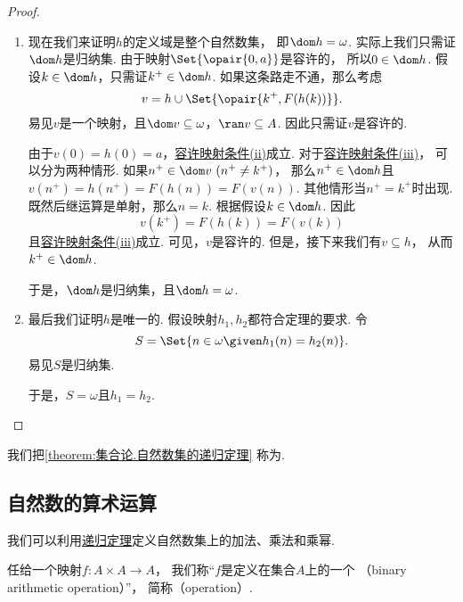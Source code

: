 \begin{theorem}[递归定理]
\begin{proof}
\begin{enumerate}
	\item 现在我们来证明\(h\)的定义域是整个自然数集，
	即\(\dom h = \omega\).
	实际上我们只需证\(\dom h\)是归纳集.
	由于映射\(\Set{\opair{0,a}}\)是容许的，
	所以\(0 \in \dom h\).
	假设\(k \in \dom h\)，只需证\(k^+ \in \dom h\).
	如果这条路走不通，那么考虑\begin{equation*}
		v = h \cup \Set{\opair{k^+,F(h(k))}}.
	\end{equation*}
	易见\(v\)是一个映射，且\(\dom v \subseteq \omega\)，\(\ran v \subseteq A\).
	因此只需证\(v\)是容许的.

	由于\(v(0) = h(0) = a\)，\hyperref[item:集合论.容许映射条件2]{容许映射条件(ii)}成立.
	对于\hyperref[item:集合论.容许映射条件3]{容许映射条件(iii)}，
	可以分为两种情形.
	如果\(n^+ \in \dom v\ (n^+ \neq k^+)\)，
	那么\(n^+ \in \dom h\)且\(v(n^+) = h(n^+) = F(h(n)) = F(v(n))\).
	其他情形当\(n^+ = k^+\)时出现.
	既然后继运算是单射，那么\(n=k\).
	根据假设\(k \in \dom h\).
	因此\begin{equation*}
		v(k^+) = F(h(k)) = F(v(k))
	\end{equation*}
	且\hyperref[item:集合论.容许映射条件3]{容许映射条件(iii)}成立.
	可见，\(v\)是容许的.
	但是，接下来我们有\(v \subseteq h\)，
	从而\(k^+ \in \dom h\).

	于是，\(\dom h\)是归纳集，且\(\dom h = \omega\).

	\item 最后我们证明\(h\)是唯一的.
	假设映射\(h_1,h_2\)都符合定理的要求.
	令\begin{equation*}
		S = \Set{ n \in \omega \given h_1(n) = h_2(n) }.
	\end{equation*}
	易见\(S\)是归纳集.

	于是，\(S = \omega\)且\(h_1 = h_2\).
	\qedhere
\end{enumerate}
\end{proof}
\end{theorem}
我们把\cref{theorem:集合论.自然数集的递归定理} 称为.

\subsection{自然数的算术运算}
我们可以利用\hyperref[theorem:集合论.自然数集的递归定理]{递归定理}定义自然数集上的加法、乘法和乘幂.

\begin{definition}\label{definition:集合论.二元代数运算}
任给一个映射\(f\colon A \times A \to A\)，
我们称“\(f\)是定义在集合\(A\)上的一个%
（binary arithmetic operation）”，
简称（operation）.
\end{definition}

